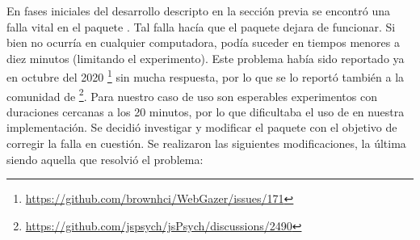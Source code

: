 En fases iniciales del desarrollo descripto en la sección previa se encontró
una falla vital en el paquete \webgazer.
Tal falla hacía que el paquete dejara de funcionar.
Si bien no ocurría en cualquier computadora, podía suceder en tiempos menores a
diez minutos (limitando el experimento).
Este problema había sido reportado ya en octubre del 2020
\footnote{\url{https://github.com/brownhci/WebGazer/issues/171}} sin mucha
respuesta, por lo que se lo reportó también a la comunidad de \jspsych
\footnote{\url{https://github.com/jspsych/jsPsych/discussions/2490}}.
Para nuestro caso de uso son esperables experimentos con duraciones cercanas a
los 20 minutos, por lo que dificultaba el uso de \webgazer en nuestra
implementación.
Se decidió investigar y modificar el paquete con el objetivo de corregir la
falla en cuestión.
Se realizaron las siguientes modificaciones, la última siendo aquella que
resolvió el problema:
